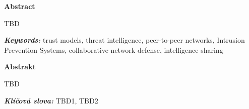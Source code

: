 \newenvironment{abstractpage}
  {\cleardoublepage\thispagestyle{empty}}
  {\vfill\cleardoublepage}
\newenvironment{abstract}[1]
  {\bigskip
   \begin{center}\bfseries#1\end{center}\small\leftskip=0.5cm\rightskip=0.5cm}
  {\par\bigskip}

\providecommand{\keywords}[2]{\footnotesize\textbf{\textit{#1:}} #2}

\begin{abstractpage}
\begin{abstract}{Abstract}





%  
TBD 
\end{abstract}

\keywords{Keywords}{trust models, threat intelligence, peer-to-peer networks, Intrusion Prevention Systems, collaborative network defense, intelligence sharing}

\vspace*{\fill}

\begin{abstract}{Abstrakt}
    TBD 
    
\end{abstract}
\keywords{Klíčová slova}{TBD1, TBD2} 

\end{abstractpage}
\thispagestyle{empty}

\cleardoublepage
